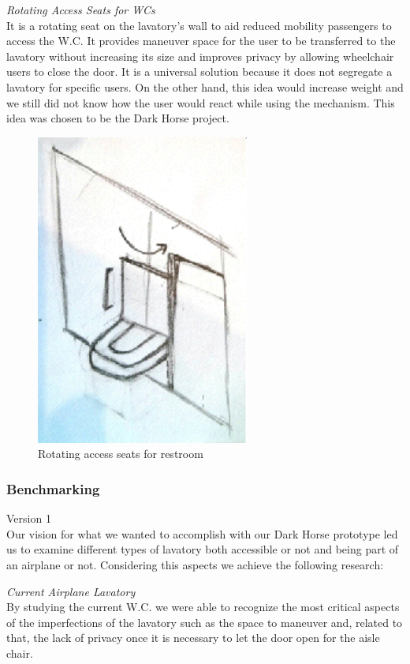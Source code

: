 \noindent\emph{Rotating Access Seats for WCs}\\ It is a rotating seat on the lavatory’s wall to aid reduced mobility passengers to access the W.C. It provides maneuver space for the user to be transferred to the lavatory without increasing its size and improves privacy by allowing wheelchair users to close the door. It is a universal solution because it does not segregate a lavatory for specific users. On the other hand, this idea would increase weight and we still did not know how the user would react while using the mechanism. This idea was chosen to be the Dark Horse project.\\

\begin{figure}[h]
\centering
\includegraphics[width=7cm]{brazil_images/image011.png}
\caption{Rotating access seats for restroom}
\label{fig:rotating_seat}
\end{figure}

\subsubsection{Benchmarking}
Version 1 \\

Our vision for what we wanted to accomplish with our Dark Horse prototype led us to examine different types of lavatory both accessible or not and being part of an airplane or not.  Considering this aspects we achieve the following research:

\noindent\emph{Current Airplane Lavatory}\\ By studying the current W.C. we were able to recognize the most critical aspects of the imperfections of the lavatory such as the space to maneuver and, related to that, the lack of privacy once it is necessary to let the door open for the aisle chair.

